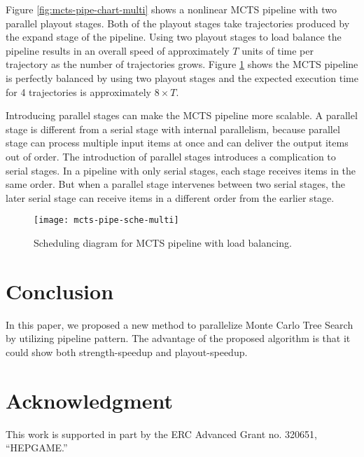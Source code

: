 \documentclass[10pt, conference, compsocconf]{IEEEtran}
\begin{document}
Figure \ref{fig:mcts-pipe-chart-multi} shows a nonlinear MCTS pipeline with two parallel playout stages. Both of the playout stages take trajectories produced by the expand stage of the pipeline. Using two playout stages to load balance the pipeline results in an overall speed of approximately $T$ units of time per trajectory as the number of trajectories grows. 
Figure \ref{fig:mcts-pipe-sche-multi} shows the MCTS pipeline is perfectly balanced by using two playout stages and the expected execution time for 4 trajectories is approximately $8\times T$.










Introducing parallel stages can make the MCTS pipeline more scalable. A parallel stage is different from a serial stage with internal parallelism, because parallel stage can process multiple input items at once and can deliver the output items out of order. The introduction of parallel stages introduces a complication to serial stages. In a pipeline with only serial stages, each stage receives items in the same order. But when a parallel stage intervenes between two serial stages, the later serial stage can receive items in a different order from the earlier stage.
\begin{figure}
\centering
\texttt{[image: mcts-pipe-sche-multi]}
\caption{Scheduling diagram for MCTS pipeline with load balancing.}
\label{fig:mcts-pipe-sche-multi}
\end{figure}

\section{Conclusion}
In this paper, we proposed a new method to parallelize Monte Carlo Tree Search by utilizing pipeline pattern. The advantage of the proposed algorithm is that it could show both strength-speedup and playout-speedup. 
\label{sec:conclusion}

\section*{Acknowledgment}
This work is supported in part by the ERC Advanced Grant no. 320651, “HEPGAME.”








\end{document}
